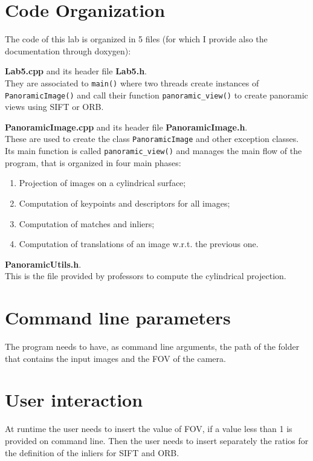 \documentclass{article}
\begin{document}
\section{Code Organization}
The code of this lab is organized in 5 files (for which I provide also the documentation through doxygen):
\begin{itemize}
\item{\textbf{Lab5.cpp} and its header file \textbf{Lab5.h}.\\
They are associated to \texttt{main()} where two threads create instances of \texttt{PanoramicImage()} and call their function \texttt{panoramic\_view()} to create panoramic views using SIFT or ORB.}
\item{\textbf{PanoramicImage.cpp} and its header file \textbf{PanoramicImage.h}.\\
These are used to create the class \texttt{PanoramicImage} and other exception classes. Its main function is called \texttt{panoramic\_view()} and manages the main flow of the program, that is organized in four main phases:
\begin{enumerate}
\item{Projection of images on a cylindrical surface;}
\item{Computation of keypoints and descriptors for all images;}
\item{Computation of matches and inliers;}
\item{Computation of translations of an image w.r.t. the previous one.}
\end{enumerate}
\item{\textbf{PanoramicUtils.h}.\\
This is the file provided by professors to compute the cylindrical projection.}
}
\end{itemize}
\section{Command line parameters}
The program needs to have, as command line arguments, the path of the folder that contains the input images and the FOV of the camera.
\section{User interaction}
At runtime the user needs to insert the value of FOV, if a value less than 1 is provided on command line. Then the user needs to insert separately the ratios for the definition of the inliers for SIFT and ORB.
\end{document}
